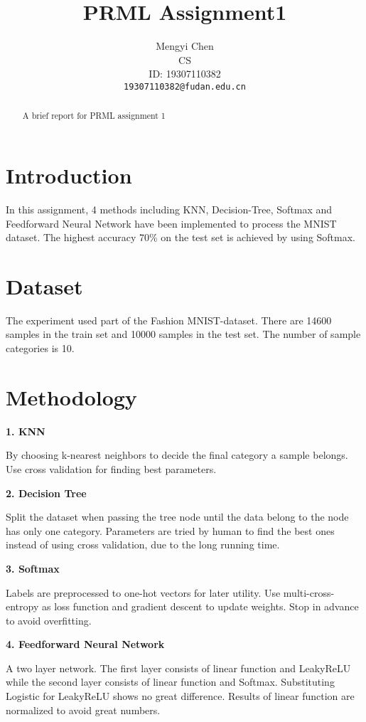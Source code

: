 \documentclass{article}
\title{PRML Assignment1 %
}
\author{%
  Mengyi Chen\\ %
  CS \\ %
  ID: 19307110382 \\
  \texttt{19307110382@fudan.edu.cn} \\
}
\begin{document}
\maketitle

\begin{abstract}
   A brief report for PRML assignment 1
\end{abstract}

\section{Introduction}
In this assignment, 4 methods including KNN, Decision-Tree, Softmax and Feedforward Neural Network have been implemented to process the MNIST dataset. The highest accuracy 70\%  on the test set is achieved by using Softmax.

\section{Dataset}
The experiment used part of the Fashion MNIST-dataset. There are 14600 samples in the train set and 10000 samples in the test set. The number of sample categories is 10.


\section{Methodology}
\textbf{1. KNN}

By choosing k-nearest neighbors to decide the final category a sample belongs. Use cross validation for finding best parameters.

\textbf{2. Decision Tree}

Split the dataset when passing the tree node until the data belong to the node has only one category. Parameters are tried by human to find the best ones instead of using cross validation, due to the long running time. 

\textbf{3. Softmax}

Labels are preprocessed to one-hot vectors for later utility. Use multi-cross-entropy as loss function and gradient descent to update weights. Stop in advance to avoid overfitting.

\textbf{4. Feedforward Neural Network}

A two layer network. The first layer consists of linear function and LeakyReLU while the second layer consists of linear function and Softmax. Substituting Logistic for LeakyReLU shows no great difference. Results of linear function are normalized to avoid great numbers.
\end{document}

